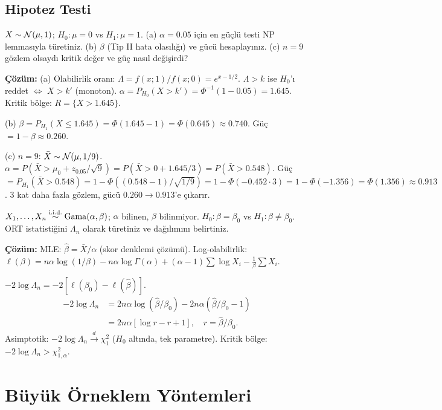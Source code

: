 \subsection{Hipotez Testi}

\begin{ornek}
$X\sim\mathcal{N}(\mu,1)$; $H_0:\mu=0$ vs $H_1:\mu=1$.
(a) $\alpha=0.05$ için en güçlü testi NP lemmasıyla türetiniz.
(b) $\beta$ (Tip II hata olasılığı) ve gücü hesaplayınız.
(c) $n=9$ gözlem olsaydı kritik değer ve güç nasıl değişirdi?

\textbf{Çözüm:}
(a) Olabilirlik oranı: $\Lambda=f(x;1)/f(x;0)=e^{x-1/2}$. $\Lambda>k$ ise $H_0$'ı reddet $\iff$ $X>k'$ (monoton).
$\alpha=P_{H_0}(X>k')=\Phi^{-1}(1-0.05)=1.645$. Kritik bölge: $R=\{X>1.645\}$.

(b) $\beta=P_{H_1}(X\leq1.645)=\Phi(1.645-1)=\Phi(0.645)\approx0.740$.
Güç $=1-\beta\approx0.260$.

(c) $n=9$: $\bar X\sim\mathcal{N}(\mu,1/9)$. $\alpha=P(\bar X>\mu_0+z_{0.05}/\sqrt{9})=P(\bar X>0+1.645/3)=P(\bar X>0.548)$.
Güç $=P_{H_1}(\bar X>0.548)=1-\Phi((0.548-1)/\sqrt{1/9})=1-\Phi(-0.452\cdot3)=1-\Phi(-1.356)=\Phi(1.356)\approx0.913$.
3 kat daha fazla gözlem, gücü $0.260\to0.913$'e çıkarır.
\end{ornek}

\begin{ornek}
$X_1,\ldots,X_n\overset{\text{i.i.d.}}{\sim}\operatorname{Gama}(\alpha,\beta)$; $\alpha$ bilinen, $\beta$ bilinmiyor.
$H_0:\beta=\beta_0$ vs $H_1:\beta\neq\beta_0$.
ORT istatistiğini $\Lambda_n$ olarak türetiniz ve dağılımını belirtiniz.

\textbf{Çözüm:}
MLE: $\hat\beta=\bar X/\alpha$ (skor denklemi çözümü). Log-olabilirlik:
$\ell(\beta)=n\alpha\log(1/\beta)-n\alpha\log\Gamma(\alpha)+(\alpha-1)\sum\log X_i-\frac{1}{\beta}\sum X_i$.

$-2\log\Lambda_n = -2[\ell(\beta_0)-\ell(\hat\beta)]$.
\begin{align*}
  -2\log\Lambda_n &= 2n\alpha\log(\hat\beta/\beta_0)-2n\alpha(\hat\beta/\beta_0-1) \\
  &= 2n\alpha[\log r - r + 1], \quad r=\hat\beta/\beta_0.
\end{align*}
Asimptotik: $-2\log\Lambda_n\xrightarrow{d}\chi^2_1$ ($H_0$ altında, tek parametre). Kritik bölge: $-2\log\Lambda_n>\chi^2_{1,\alpha}$.
\end{ornek}

\section{Büyük Örneklem Yöntemleri}
\label{app:buyuk_orneklem}

